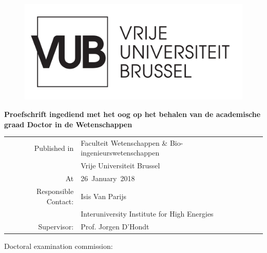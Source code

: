 
\begin{center}
	\vspace*{5mm}
     
    \begin{figure}[ht]
    	\centering
    	\includegraphics[width=0.5\linewidth]{"VUB MONO positief/VUB MONO POSITIEF OUTLINE"}
    	\label{fig:vub-mono-positief-outline}
    \end{figure}
    
	\huge \textbf{\Title}

	\vspace{10mm}

	\Large \Author
	
	\vspace{15mm}
	\large \textbf{Proefschrift ingediend met het oog op het behalen van de academische graad Doctor in de Wetenschappen}

	\vspace{25mm}
	\small
	\begin{tabular}{rl}
     Published in & Faculteit Wetenschappen \& Bio-ingenieurswetenschappen \\[2mm]
                  &\large Vrije Universiteit Brussel \\[2mm]
               At & \large 26~January~2018\\[15mm]
   Responsible Contact: & \large Isis Van Parijs \\[1mm]
                  & Interuniversity Institute for High Energies\\
                  Supervisor: & Prof. Jorgen D'Hondt
	\end{tabular}


\end{center}

\thispagestyle{empty}
\newpage
\null

Doctoral examination commission:\\

